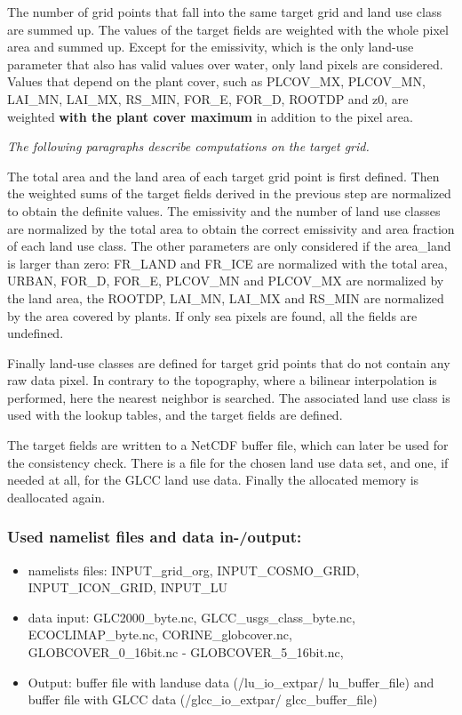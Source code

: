\documentclass[a4paper,10pt,DIV14,BCOR1cm,titlepage,twoside]{scrartcl}
\begin{document}
\noindent The number of grid points that fall into the same target grid and land use class are summed up. The values of the target fields are weighted with the whole pixel area and summed up. Except for the emissivity, which is the only land-use parameter that also has valid values over water, only land pixels are considered. Values that depend on the plant cover, such as PLCOV\_MX, PLCOV\_MN, LAI\_MN, LAI\_MX, RS\_MIN, FOR\_E, FOR\_D, ROOTDP and z0, are weighted \textbf{with the plant cover maximum} in addition to the pixel area. \par\medskip\noindent
\textit{The following paragraphs describe computations on the target grid.}  \par\medskip\noindent
The total area and the land area of each target grid point is first defined. Then the weighted sums of the target fields derived in the previous step are normalized to obtain the definite values. The emissivity and the number of land use classes are normalized by the total area to obtain the correct emissivity and area fraction of each land use class. The other parameters are only considered if the area\_land is larger than zero: FR\_LAND and FR\_ICE are normalized with the total area, URBAN, FOR\_D, FOR\_E, PLCOV\_MN and PLCOV\_MX are normalized by the land area, the ROOTDP, LAI\_MN, LAI\_MX and RS\_MIN are normalized by the area covered by plants. If only sea pixels are found, all the fields are undefined.  \par\medskip\noindent
Finally land-use classes are defined for target grid points that do not contain any raw data pixel. In contrary to the topography, where a bilinear interpolation is performed, here the nearest neighbor is searched. The associated land use class is used with the lookup tables, and the target fields are defined.  \par\medskip\noindent
The target fields are written to a NetCDF buffer file, which can later be used for the consistency check. There is a file for the chosen land use data set, and one, if needed at all, for the GLCC land use data. Finally the allocated memory is deallocated again.  \par\medskip\noindent
\subsubsection{Used namelist files and data in-/output:}
\begin{itemize}
 \item namelists files: INPUT\_grid\_org, INPUT\_COSMO\_GRID, INPUT\_ICON\_GRID, INPUT\_LU 
 \item data input:  GLC2000\_byte.nc, GLCC\_usgs\_class\_byte.nc, \\
     ECOCLIMAP\_byte.nc, CORINE\_globcover.nc, \\ 
     GLOBCOVER\_0\_16bit.nc - GLOBCOVER\_5\_16bit.nc,              
 \item Output: buffer file with landuse data (/lu\_io\_extpar/ lu\_buffer\_file) and buffer file with GLCC data (/glcc\_io\_extpar/ glcc\_buffer\_file)
\end{itemize}
\end{document}
